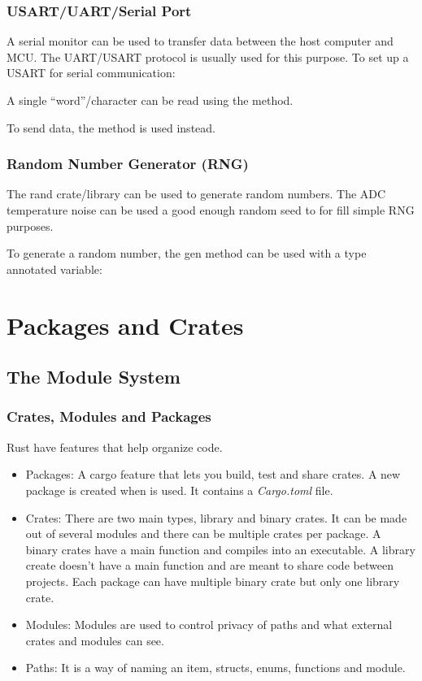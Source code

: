 \documentclass{beamer}
\begin{document}
\begin{frame}[allowframebreaks]
  \frametitle{USART/UART/Serial Port}
  A serial monitor can be used to transfer data between the host computer and MCU. The UART/USART protocol is usually used for this purpose. To set up a USART for serial communication:
  
  

  A single ``word''/character can be read using the  method.
  

  To send data, the  method is used instead.
  
\end{frame}

\begin{frame}
  \frametitle{Random Number Generator (RNG)}
  The rand crate/library can be used to generate random numbers. The ADC temperature noise can be used a good enough random seed to for fill simple RNG purposes.
  

  To generate a random number, the gen method can be used with a type annotated variable:
  
\end{frame}

\section{Packages and Crates}
\subsection{The Module System}
\begin{frame} \frametitle{Crates, Modules and Packages} Rust have features that help organize code.

  \begin{itemize}
    \item{Packages: A cargo feature that lets you build, test and share crates. A new package is created when  is used. It contains a \emph{Cargo.toml} file.}
    \item{Crates: There are two main types, library and binary crates. It can be made out of several modules and there can be multiple crates per package. A binary crates have a main function and compiles into an executable. A library create doesn't have a main function and are meant to share code between projects. Each package can have multiple binary crate but only one library crate.}
    \item{Modules: Modules are used to control privacy of paths and what external crates and modules can see.}
    \item{Paths: It is a way of naming an item, structs, enums, functions and module.}
  \end{itemize}
\end{frame}
\end{document}
